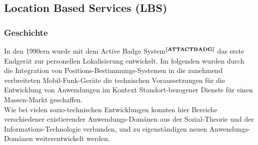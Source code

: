 \subsection{Location Based Services (LBS)}\label{3_LBS_HIST}
\subsubsection{Geschichte}
In den 1990ern wurde mit dem Active Badge System$^{\textbf{\ref{ATTACTBADG}}}$ das erste Endgerät zur personellen Lokalisierung entwickelt.
Im folgenden wurden durch die Integration von Positions-Bestimmungs-Systemen in die zunehmend verbreiteten Mobil-Funk-Geräte die technischen Voraussetzungen für die Entwicklung von Anwendungen im Kontext Standort-bezogener Dienste für einen Massen-Markt geschaffen.\\
Wie bei vielen sozio-technischen Entwicklungen konnten hier Bereiche verschiedener existierender Anwendungs-Domänen aus der Sozial-Theorie und der Informations-Technologie verbunden, und zu eigenständigen neuen Anwendungs-Domänen weiterentwickelt werden.
